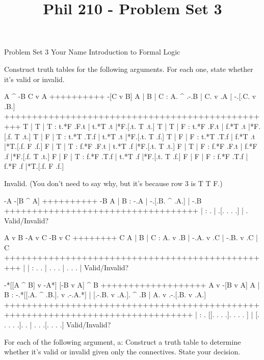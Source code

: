 
\title{Phil 210 - Problem Set 3}

\heading
Problem Set 3
Your Name
Introduction to Formal Logic
\endheading

Construct truth tables for the following arguments. For each one, state whether it's valid or invalid.

\problems
{}
\argument
 A ^ -B
 C v A
++++++++++
 -[C v B]
\endargument
        \answer
        \truthtable
         A | B | C : A. ^ .-.B | C. v .A | -.[.C. v .B.]
        +++++++++++++++++++++++++++++++++++++++++++++++++
         T | T | T : t.*F .F.t | t.*T .t |*F.[.t. T .t.]
         T | T | F : t.*F .F.t | f.*T .t |*F.[.f. T .t.]
         T | F | T : t.*T .T.f | t.*T .t |*F.[.t. T .f.]
         T | F | F : t.*T .T.f | f.*T .t |*T.[.f. F .f.]
         F | T | T : f.*F .F.t | t.*T .f |*F.[.t. T .t.]
         F | T | F : f.*F .F.t | f.*F .f |*F.[.f. T .t.]
         F | F | T : f.*F .T.f | t.*T .f |*F.[.t. T .f.]
         F | F | F : f.*F .T.f | f.*F .f |*T.[.f. F .f.]
        \endtruthtable

        Invalid. (You don't need to say why, but it's because row 3 is T T F.)
        \endanswer

\argument
 -A
 -[B ^ A]
++++++++++
 -B
\endargument
        \answer
        \truthtable
         A | B : -.A | -.[.B. ^ .A.] | -.B
        +++++++++++++++++++++++++++++++++++
           |   :  .  |  .[. .   . .] |  . 
        \endtruthtable
        Valid/Invalid?
        \endanswer

\argument
 A v B
 -A v C
 -B v C
++++++++
 C
\endargument
        \answer
        \truthtable
         A | B | C : A. v .B | -.A. v .C | -.B. v .C | C
        +++++++++++++++++++++++++++++++++++++++++++++++++
           |   |   :  .   .  |  . .   .  |  . .   .  |  
        \endtruthtable
        Valid/Invalid?
        \endanswer

\argument
 -*[[A ^ B] v -A*]
 [-B v A] ^ B
+++++++++++++++++++
 A v -[B v A]
\endargument
        \answer
        \truthtable
         A | B : -.*[[.A. ^ .B.]. v .-.A.*] | [.-.B. v .A.]. ^ .B | A. v .-.[.B. v .A.]
        ++++++++++++++++++++++++++++++++++++++++++++++++++++++++++++++++++++++++++++++++
           |   :  . [[. .   . .].   . . . ] | [. . .   . .].   .  |  .   . .[. .   . .]
        \endtruthtable
        Valid/Invalid?
        \endanswer
\endproblems

For each of the following argument,
\list
a: Construct a truth table to determine whether it's valid or invalid given only the connectives. State your decision.

